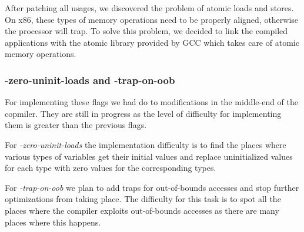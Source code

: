 After patching all usages, we discovered the problem of atomic loads and stores.
On x86, these types of memory operations need to be properly aligned, otherwise
the processor will trap. To solve this problem, we decided to link the compiled
applications with the atomic library provided by GCC which takes care of atomic
memory operations.

\subsubsection{-zero-uninit-loads and -trap-on-oob}

For implementing these flags we had do to modifications in the middle-end of the
copmiler. They are still in progress as the level of difficulty for implementing
them is greater than the previous flags.

For \textit{-zero-uninit-loads} the implementation difficulty is to find the
places where various types of variables get their initial values and replace
uninitialized values for each type with zero values for the corresponding types.

For \textit{-trap-on-oob} we plan to add traps for out-of-bounds accesses and
stop further optimizations from taking place. The difficulty for this task is to
spot all the places where the compiler exploits out-of-bounds accesses as there
are many places where this happens.
